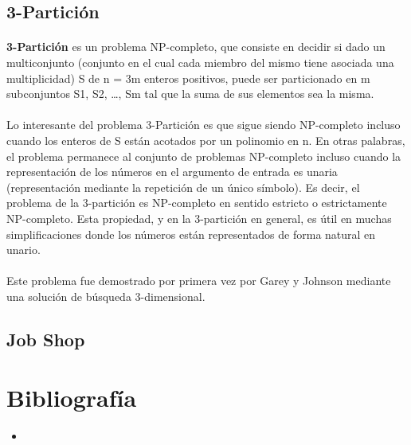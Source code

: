 \documentclass[11pt, a4paper,spanish]{article}
\begin{document}
			\subsection{3-Partición}

				\paragraph{}
				{\bf 3-Partición} es un problema NP-completo, que consiste en decidir si dado un multiconjunto  (conjunto en el cual cada miembro del mismo tiene asociada una multiplicidad) S de n = 3m enteros positivos, puede ser particionado en m subconjuntos S1, S2, …, Sm tal que la suma de sus elementos sea la misma.
			
				\paragraph{}
				Lo interesante del problema 3-Partición es que sigue siendo NP-completo incluso cuando los enteros de S están acotados por un polinomio en n. En otras palabras, el problema permanece al conjunto de problemas NP-completo incluso cuando la representación de los números en el argumento de entrada es unaria (representación mediante la repetición de un único símbolo). Es decir, el problema de la 3-partición es NP-completo en sentido estricto o estrictamente NP-completo. Esta propiedad, y en la 3-partición en general, es útil en muchas simplificaciones donde los números están representados de forma natural en unario.
	
				\paragraph{}
				Este problema fue demostrado por primera vez por Garey y Johnson mediante una solución de búsqueda 3-dimensional.
				
			
			
			\subsection{Job Shop}

	
	\newpage

		\section{Bibliografía}

			\begin{itemize}
			
				\item
		
			\end{itemize}
\end{document}
